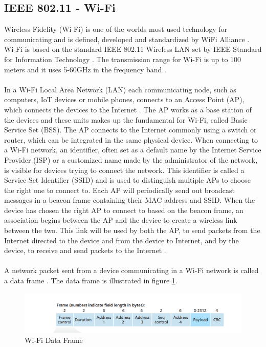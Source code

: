 \subsection{IEEE 802.11 - Wi-Fi}
Wireless Fidelity (Wi-Fi) \cite{WiFiAlliance} is one of the worlds most used technology for communicating and is defined, developed and standardized by WiFi Alliance \cite{WiFiAlliance}. Wi-Fi is based on the standard IEEE 802.11 Wireless LAN set by IEEE Standard for Information Technology \cite{WifiStandard}. The transmission range for Wi-Fi is up to 100 meters and it uses 5-60GHz in the frequency band \cite{IAQMonitorCommunicationReview}.
\\\\
In a Wi-Fi Local Area Network (LAN) each communicating node, such as computers, IoT devices or mobile phones, connects to an Access Point (AP), which connects the devices to the Internet \cite{Datacom}. The AP works as a base station of the devices and these units makes up the fundamental for Wi-Fi, called Basic Service Set (BSS). The AP connects to the Internet commonly using a switch or router, which can be integrated in the same physical device. When connecting to a Wi-Fi network, an identifier, often set as a default name by the Internet Service Provider (ISP) or a customized name made by the administrator of the network, is visible for devices trying to connect the network. This identifier is called a Service Set Identifier (SSID) and is used to distinguish multiple APs to choose the right one to connect to. Each AP will periodically send out broadcast messages in a beacon frame containing their MAC address and SSID. When the device has chosen the right AP to connect to based on the beacon frame, an association begins between the AP and the device to create a wireless link between the two. This link will be used by both the AP, to send packets from the Internet directed to the device and from the device to Internet, and by the device, to receive and send packets to the Internet \cite{Datacom}. 
\\\\
A network packet sent from a device communicating in a Wi-Fi network is called a data frame \cite{Datacom}. The data frame is illustrated in figure \ref{fig:WiFiDataframe}.

\begin{figure}
    \includegraphics[width=1\textwidth]{figures/WifiDataFrame.png}
    \caption{Wi-Fi Data Frame \cite{Datacom}}
    \centering
    \label{fig:WiFiDataframe}
\end{figure}

